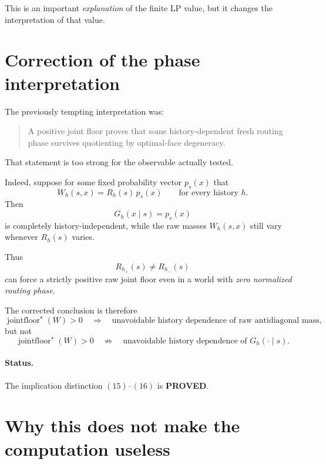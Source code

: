 \documentclass[11pt,a4paper]{article}
\newcommand{\jointfloor}{\operatorname{jointfloor}}
\newcommand{\PROVED}{\textcolor{green!45!black}{\textbf{PROVED}}}
\begin{document}
This is an important \emph{explanation} of the finite LP value, but it changes
the interpretation of that value.

\section{Correction of the phase interpretation}

The previously tempting interpretation was:

\begin{quote}
A positive joint floor proves that some history-dependent fresh routing phase
survives quotienting by optimal-face degeneracy.
\end{quote}

That statement is too strong for the observable actually tested.

Indeed, suppose for some fixed probability vector \(p_s(x)\) that
\begin{equation}
\boxed{
W_h(s,x)=R_h(s)\,p_s(x)
\qquad
\text{for every history }h.
}
\tag{14}
\end{equation}
Then
\[
G_h(x\mid s)=p_s(x)
\]
is completely history-independent, while the raw masses \(W_h(s,x)\) still
vary whenever \(R_h(s)\) varies.

Thus
\[
R_{h_+}(s)\neq R_{h_-}(s)
\]
can force a strictly positive raw joint floor even in a world with
\emph{zero normalized routing phase}.

The corrected conclusion is therefore
\begin{equation}
\boxed{
\jointfloor^\star(W)>0
\quad\Longrightarrow\quad
\text{unavoidable history dependence of raw antidiagonal mass,}
}
\tag{15}
\end{equation}
but not
\begin{equation}
\boxed{
\jointfloor^\star(W)>0
\quad\not\Longrightarrow\quad
\text{unavoidable history dependence of }G_h(\cdot\mid s).
}
\tag{16}
\end{equation}

\paragraph{Status.}
The implication distinction \((15)\)--\((16)\) is \PROVED.

\section{Why this does not make the computation useless}
\end{document}
